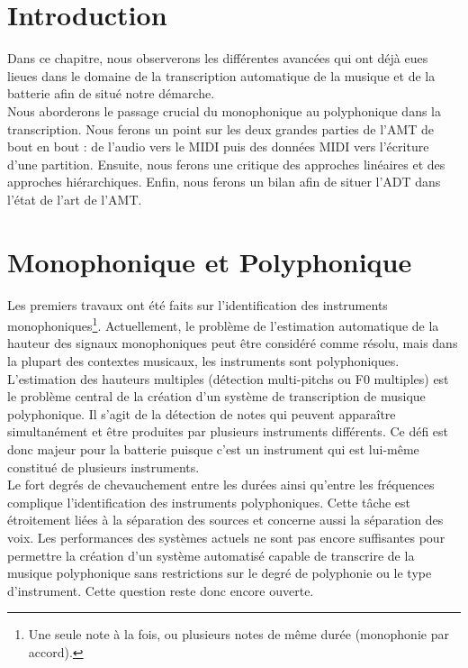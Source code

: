 \section*{Introduction}
Dans ce chapitre, nous observerons les différentes avancées qui ont déjà eues lieues dans le domaine de la transcription automatique de la musique et de la batterie afin de situé notre démarche.\\
Nous aborderons le passage crucial du monophonique au polyphonique dans la transcription. Nous ferons un point sur les deux grandes parties de l’AMT de bout en bout : de l’audio vers le MIDI puis des données MIDI vers l’écriture d’une partition. Ensuite, nous ferons une critique des approches linéaires et des approches hiérarchiques. Enfin, nous ferons un bilan afin de situer l’ADT dans l’état de l’art de l’AMT.
\section{Monophonique et Polyphonique}
Les premiers travaux ont été faits sur l’identification des instruments monophoniques\footnote{Une seule note à la fois, ou plusieurs notes de même durée (monophonie par accord).}\cite{future_directions}. Actuellement, le problème de l'estimation automatique de la hauteur des signaux monophoniques peut être considéré comme résolu, mais dans la plupart des contextes musicaux, les instruments sont polyphoniques.\\
L'estimation des hauteurs multiples (détection multi-pitchs ou F0 multiples) est le problème central de la création d'un système de transcription de musique polyphonique. Il s’agit de la détection de notes qui peuvent apparaître simultanément et être produites par plusieurs instruments différents. Ce défi est donc majeur pour la batterie puisque c’est un instrument qui est lui-même constitué de plusieurs instruments.\\
Le fort degrés de chevauchement entre les durées ainsi qu’entre les fréquences complique l’identification des instruments polyphoniques. Cette tâche est étroitement liées à la séparation des sources et concerne aussi la séparation des voix. Les performances des systèmes actuels ne sont pas encore suffisantes pour permettre la création d'un système automatisé capable de transcrire de la musique polyphonique sans restrictions sur le degré de polyphonie ou le type d'instrument. Cette question reste donc encore ouverte. 
